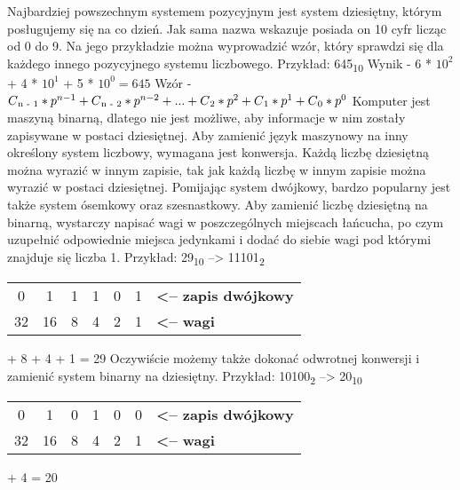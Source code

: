 \documentclass[12pt, a4paper, onside, polish]{article}				%
\begin{document}
\vspace{10mm}
Najbardziej powszechnym systemem pozycyjnym jest system dziesiętny, którym posługujemy się na co dzień. Jak sama nazwa wskazuje posiada on 10 cyfr licząc od 0 do 9. Na jego przykładzie można wyprowadzić wzór, który sprawdzi się dla każdego innego pozycyjnego systemu liczbowego.
\vspace{5mm}
\newline
Przykład: {645\textsubscript{10}}
\vspace{5mm}
\newline
Wynik - 6 * $10^{2}$ + 4 * $10^{1}$ + 5 * $10^{0} = 645$
\newline
Wzór - $C\textsubscript{n - 1} * p^{n - 1} + C\textsubscript{n - 2} * p^{n - 2} + ... + C\textsubscript{2} * p^{2} + C\textsubscript{1} * p^{1} + C\textsubscript{0} * p^{0}$
\newline\newline
Komputer jest maszyną binarną, dlatego nie jest możliwe, aby informacje w nim zostały zapisywane w postaci dziesiętnej. Aby zamienić język maszynowy na inny określony system liczbowy, wymagana jest konwersja. Każdą liczbę dziesiętną można wyrazić w innym zapisie, tak jak każdą liczbę w innym zapisie można wyrazić w postaci dziesiętnej. Pomijając system dwójkowy, bardzo popularny jest także system ósemkowy oraz szesnastkowy. Aby zamienić liczbę dziesiętną na binarną, wystarczy napisać wagi w poszczególnych miejscach łańcucha, po czym uzupełnić odpowiednie miejsca jedynkami i dodać do siebie wagi pod którymi znajduje się liczba 1. 
\vspace{5mm}
\newline
Przykład: 29\textsubscript{10} -->  11101\textsubscript{2}
\begin{table}[htb]
\centering
\begin{tabular}{ccccccl}
0  & 1  & 1 & 1 & 0 & 1 & \textbf{\textless{}-- zapis dwójkowy} \\ \cline{1-6}
32 & 16 & 8 & 4 & 2 & 1 & \textbf{\textless{}-- wagi}          
\end{tabular}
\end{table}
 + 8 + 4 + 1 = 29
\vspace{10mm}
\cleardoublepage
Oczywiście możemy także dokonać odwrotnej konwersji i zamienić system binarny na dziesiętny. 
\vspace{5mm}
\newline
Przykład: 10100\textsubscript{2} -->  20\textsubscript{10}
\begin{table}[htb]
\centering
\begin{tabular}{ccccccl}
0  & 1  & 0 & 1 & 0 & 0 & \textbf{\textless{}-- zapis dwójkowy} \\ \cline{1-6}
32 & 16 & 8 & 4 & 2 & 1 & \textbf{\textless{}-- wagi}          
\end{tabular}
\end{table}
 + 4 = 20
\newline
\end{document}
